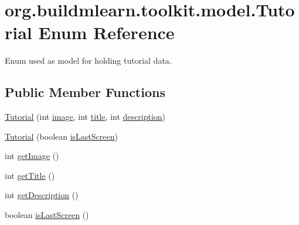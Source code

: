 \hypertarget{enumorg_1_1buildmlearn_1_1toolkit_1_1model_1_1Tutorial}{}\section{org.\+buildmlearn.\+toolkit.\+model.\+Tutorial Enum Reference}
\label{enumorg_1_1buildmlearn_1_1toolkit_1_1model_1_1Tutorial}


Enum used as model for holding tutorial data.  


\subsection*{Public Member Functions}
\begin{DoxyCompactItemize}
\item 
\hyperlink{enumorg_1_1buildmlearn_1_1toolkit_1_1model_1_1Tutorial_aebfb554db49a2a1136c01d58571ad64c}{Tutorial} (int \hyperlink{enumorg_1_1buildmlearn_1_1toolkit_1_1model_1_1Tutorial_adb9c70865c52a85ec9b4149cb61f84e7}{image}, int \hyperlink{enumorg_1_1buildmlearn_1_1toolkit_1_1model_1_1Tutorial_a6cd2b7c4e1b8b48f0d7eccdc13b57d09}{title}, int \hyperlink{enumorg_1_1buildmlearn_1_1toolkit_1_1model_1_1Tutorial_ac12a03d6552952f23bd952d50f2d227d}{description})
\item 
\hyperlink{enumorg_1_1buildmlearn_1_1toolkit_1_1model_1_1Tutorial_ac2bce108bcd8dbf3d56509e7985747a4}{Tutorial} (boolean \hyperlink{enumorg_1_1buildmlearn_1_1toolkit_1_1model_1_1Tutorial_aa471a8182eb2c792a3764385fbd71cb7}{is\+Last\+Screen})
\item 
int \hyperlink{enumorg_1_1buildmlearn_1_1toolkit_1_1model_1_1Tutorial_a579bb6f85a64016cf0332ab0a822a73b}{get\+Image} ()
\item 
int \hyperlink{enumorg_1_1buildmlearn_1_1toolkit_1_1model_1_1Tutorial_a09f932237280e91090c6eff580ac0ca7}{get\+Title} ()
\item 
int \hyperlink{enumorg_1_1buildmlearn_1_1toolkit_1_1model_1_1Tutorial_a78e34e62ed6799264a4d241d1cd522d6}{get\+Description} ()
\item 
boolean \hyperlink{enumorg_1_1buildmlearn_1_1toolkit_1_1model_1_1Tutorial_a1d5c768cd3cf821049aea352f6c07d00}{is\+Last\+Screen} ()
\end{DoxyCompactItemize}
